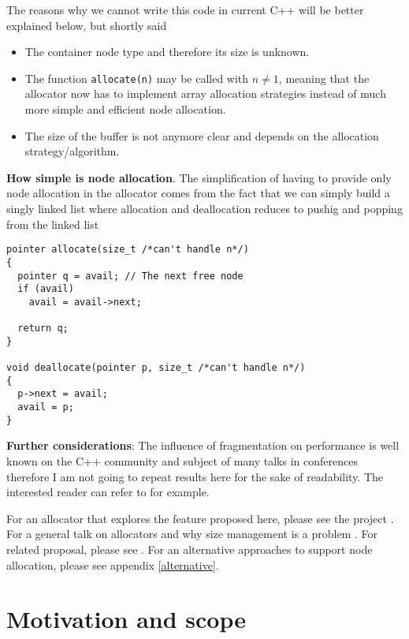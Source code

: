 \documentclass[11pt]{article}
\begin{document}
The reasons why we cannot write this code in current C++ will
be better explained below, but shortly said

\begin{itemize}

\item The container node type and therefore its size is unknown.

\item The function \texttt{allocate(n)} may be called with $n \ne 1$,
meaning that the allocator now has to implement array allocation strategies
instead of much more simple and efficient node allocation.

\item The size of the buffer is not anymore clear and depends
on the allocation strategy/algorithm.
\end{itemize}

\medskip
\noindent
{\bf How simple is node allocation}.  The simplification
of having to provide only node allocation in the allocator
comes from the fact that  we can simply build a singly linked list
where allocation and deallocation reduces to pushig and
popping from the linked list

\medskip
\begin{lstlisting}
pointer allocate(size_t /*can't handle n*/)
{
  pointer q = avail; // The next free node
  if (avail)
    avail = avail->next;

  return q;
}

void deallocate(pointer p, size_t /*can't handle n*/)
{
  p->next = avail;
  avail = p;
}

\end{lstlisting}

\medskip
\noindent
{\bf Further considerations}: The influence of fragmentation on
performance is well known on the C++ community and subject of many
talks in conferences therefore I am not going to repeat results here
for the sake of readability. The interested reader can refer to
\cite{chandler, meyers} for example.

For an allocator that explores the feature proposed here, please see
the project \cite{rtcpp}. For a general
talk on allocators and why size management is a problem
\cite{alexandrescu}. For related proposal, please see \cite{prop1}.
For an alternative approaches to support node allocation, please see
appendix \ref{alternative}.

\section{Motivation and scope}
\end{document}
